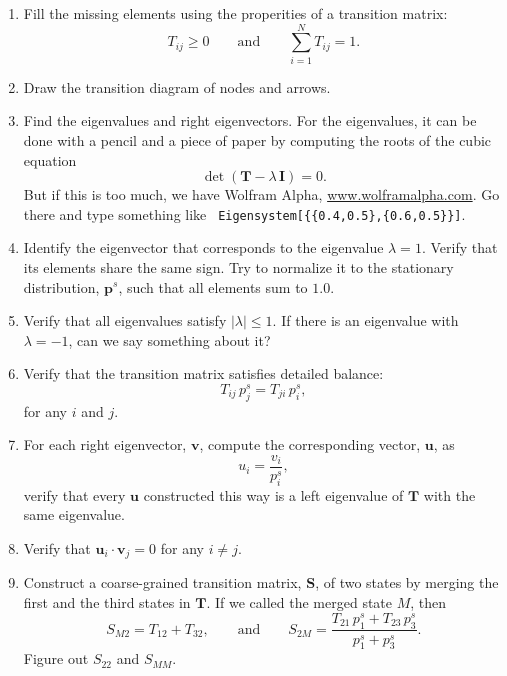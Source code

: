 \documentclass[12pt]{article}
\begin{document}
\begin{enumerate}
  \item
  Fill the missing elements using the properities of a transition matrix:
  $$
    T_{ij} \ge 0 \qquad \mathrm{and} \qquad \sum_{i = 1}^N T_{ij} = 1.
  $$

  \item
  Draw the transition diagram of nodes and arrows.

  \item
  Find the eigenvalues and right eigenvectors.
  \small{
    For the eigenvalues,
    it can be done with a pencil and a piece of paper
    by computing the roots of the cubic equation
    $$
    \det (\mathbf T - \lambda \, \mathbf I) = 0.
    $$
    But if this is too much,
    we have Wolfram Alpha, \url{www.wolframalpha.com}.
    Go there and type something like
    \texttt{
      Eigensystem[\{\{0.4,0.5\},\{0.6,0.5\}\}]}.
  }

  \item
  Identify the eigenvector that corresponds to the eigenvalue $\lambda = 1$.
  Verify that its elements share the same sign.
  Try to normalize it to the stationary distribution, $\mathbf p^s$,
  such that all elements sum to $1.0$.

  \item
  \label{prob1:eigneg1}
  Verify that all eigenvalues satisfy $|\lambda| \le 1$.
  If there is an eigenvalue with $\lambda = -1$,
  can we say something about it?

  \item
  Verify that the transition matrix satisfies detailed balance:
  $$
    T_{ij} \, p^s_j = T_{ji} \, p^s_i,
  $$
  for any $i$ and $j$.

  \item
  For each right eigenvector, $\mathbf v$,
  compute the corresponding vector, $\mathbf u$,
  as
  $$
    u_i = \frac { v_i } { p^s_i },
  $$
  verify that every $\mathbf u$
  constructed this way is a left eigenvalue of $\mathbf T$
  with the same eigenvalue.

  \item
  Verify that $\mathbf u_i \cdot \mathbf v_j = 0$
  for any $i \ne j$.

  \item
  \label{prob1:coarsegraining}
  Construct a coarse-grained transition matrix, $\mathbf S$,
  of two states by merging the first and the third states
  in $\mathbf T$. If we called the merged state $M$, then
  \begin{equation}
  S_{M2} = T_{12} + T_{32},
  \qquad \mathrm{and} \qquad
  S_{2M} =
  \frac{ T_{21} \, p^s_1 + T_{23} \, p^s_3 }
       { p^s_1 + p^s_3 }
  .
  \label{eq:coarse-graining}
  \end{equation}
  Figure out $S_{22}$ and $S_{MM}$.


\end{enumerate}
\end{document}
